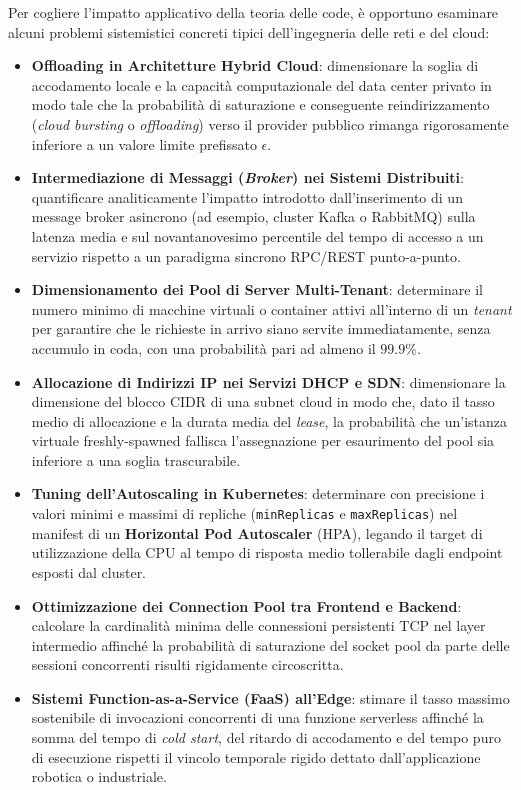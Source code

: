 \documentclass[11pt, a4paper]{article}
\begin{document}
Per cogliere l'impatto applicativo della teoria delle code, è opportuno esaminare alcuni problemi sistemistici concreti tipici dell'ingegneria delle reti e del cloud:
\begin{itemize}[leftmargin=*]
    \item \textbf{Offloading in Architetture Hybrid Cloud}: dimensionare la soglia di accodamento locale e la capacità computazionale del data center privato in modo tale che la probabilità di saturazione e conseguente reindirizzamento (\emph{cloud bursting} o \emph{offloading}) verso il provider pubblico rimanga rigorosamente inferiore a un valore limite prefissato $\epsilon$.
    \item \textbf{Intermediazione di Messaggi (\emph{Broker}) nei Sistemi Distribuiti}: quantificare analiticamente l'impatto introdotto dall'inserimento di un message broker asincrono (ad esempio, cluster Kafka o RabbitMQ) sulla latenza media e sul novantanovesimo percentile del tempo di accesso a un servizio rispetto a un paradigma sincrono RPC/REST punto-a-punto.
    \item \textbf{Dimensionamento dei Pool di Server Multi-Tenant}: determinare il numero minimo di macchine virtuali o container attivi all'interno di un \emph{tenant} per garantire che le richieste in arrivo siano servite immediatamente, senza accumulo in coda, con una probabilità pari ad almeno il $99.9\%$.
    \item \textbf{Allocazione di Indirizzi IP nei Servizi DHCP e SDN}: dimensionare la dimensione del blocco CIDR di una subnet cloud in modo che, dato il tasso medio di allocazione e la durata media del \emph{lease}, la probabilità che un'istanza virtuale freshly-spawned fallisca l'assegnazione per esaurimento del pool sia inferiore a una soglia trascurabile.
    \item \textbf{Tuning dell'Autoscaling in Kubernetes}: determinare con precisione i valori minimi e massimi di repliche (\texttt{minReplicas} e \texttt{maxReplicas}) nel manifest di un \textbf{Horizontal Pod Autoscaler} (HPA), legando il target di utilizzazione della CPU al tempo di risposta medio tollerabile dagli endpoint esposti dal cluster.
    \item \textbf{Ottimizzazione dei Connection Pool tra Frontend e Backend}: calcolare la cardinalità minima delle connessioni persistenti TCP nel layer intermedio affinché la probabilità di saturazione del socket pool da parte delle sessioni concorrenti risulti rigidamente circoscritta.
    \item \textbf{Sistemi Function-as-a-Service (FaaS) all'Edge}: stimare il tasso massimo sostenibile di invocazioni concorrenti di una funzione serverless affinché la somma del tempo di \emph{cold start}, del ritardo di accodamento e del tempo puro di esecuzione rispetti il vincolo temporale rigido dettato dall'applicazione robotica o industriale.
\end{itemize}
\end{document}
